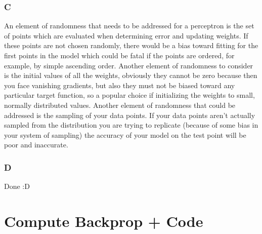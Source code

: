 \documentclass{article}
\begin{document}
\subsubsection{C}
An element of randomness that needs to be addressed for a perceptron is the set of points which are evaluated when determining error and updating weights. If these points are not chosen randomly, there would be a bias toward fitting for the first points in the model which could be fatal if the points are ordered, for example, by simple ascending order. Another element of randomness to consider is the initial values of all the weights, obviously they cannot be zero because then you face vanishing gradients, but also they must not be biased toward any particular target function, so a popular choice if initializing the weights to small, normally distributed values. Another element of randomness that could be addressed is the sampling of your data points. If your data points aren't actually sampled from the distribution you are trying to replicate (because of some bias in your system of sampling) the accuracy of your model on the test point will be poor and inaccurate.
\subsubsection{D}
Done :D

\newpage
\section{Compute Backprop + Code}
\end{document}
